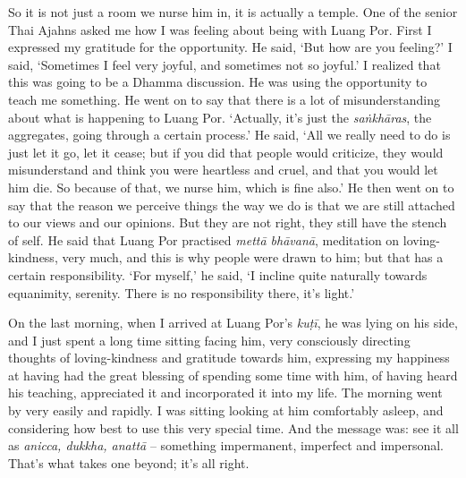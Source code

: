 So it is not just a room we nurse him in, it is actually a temple. One
of the senior Thai Ajahns asked me how I was feeling about being with
Luang Por. First I expressed my gratitude for the opportunity. He said, 
`But how are you feeling?' I said, `Sometimes I feel very joyful, and
sometimes not so joyful.' I realized that this was going to be a Dhamma
discussion. He was using the opportunity to teach me something. He went
on to say that there is a lot of misunderstanding about what is happening to
Luang Por. `Actually, it's just the \emph{saṅkhāras}, the aggregates, going
through a certain process.' He said, `All we really need to do is just
let it go, let it cease; but if you did that people would criticize, 
they would misunderstand and think you were heartless and cruel, and
that you would let him die. So because of that, we nurse him, which is
fine also.' He then went on to say that the reason we perceive things
the way we do is that we are still attached to our views and our
opinions. But they are not right, they still have the stench of self. He
said that Luang Por practised \emph{mettā bhāvanā}, meditation on
loving-kindness, very much, and this is why people were drawn to him; 
but that has a certain responsibility. `For myself,' he said, `I incline
quite naturally towards equanimity, serenity. There is no responsibility
there, it's light.'

On the last morning, when I arrived at Luang Por's \emph{kuṭī}, he was
lying on his side, and I just spent a long time sitting facing him, very
consciously directing thoughts of loving-kindness and gratitude towards
him, expressing my happiness at having had the great blessing of
spending some time with him, of having heard his teaching, appreciated
it and incorporated it into my life. The morning went by very easily and
rapidly. I was sitting looking at him comfortably asleep, and
considering how best to use this very special time. And the message was: 
see it all as \emph{anicca, dukkha, anattā} -- something impermanent, imperfect
and impersonal. That's what takes one beyond; it's all right.

